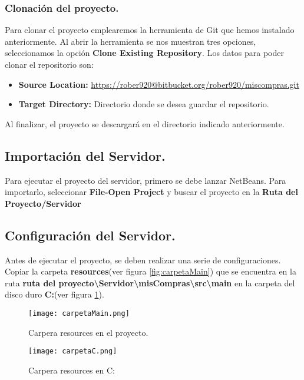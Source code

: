 \subsubsection{Clonación del proyecto.}

Para clonar el proyecto emplearemos la herramienta de Git que hemos instalado anteriormente. Al abrir la herramienta se nos muestran tres opciones, seleccionamos la opción \textbf{Clone Existing Repository}.
Los datos para poder clonar el repositorio son:
\begin{itemize}
 \item \textbf{Source Location: }\url{https://rober920@bitbucket.org/rober920/miscompras.git}
 \item \textbf{Target Directory: } Directorio donde se desea guardar el repositorio.
\end{itemize}

Al finalizar, el proyecto se descargará en el directorio indicado anteriormente.

\subsection{Importación del Servidor.}

Para ejecutar el proyecto del servidor, primero se debe lanzar NetBeans. Para importarlo, seleccionar \textbf{File-Open Project} y buscar el proyecto en la \textbf{Ruta del Proyecto/Servidor}

\cleardoublepage
\subsection{Configuración del Servidor.\label{cloneServidor}}

Antes de ejecutar el proyecto, se deben realizar una serie de configuraciones.
Copiar la carpeta \textbf{resources}(ver figura \ref{fig:carpetaMain}) que se encuentra en la ruta \textbf{ruta del proyecto\textbackslash Servidor\textbackslash misCompras\textbackslash src\textbackslash main} en la carpeta del disco duro \textbf{C:}(ver figura \ref{fig:carpetaC}).

\begin{figure}[ht]
\begin{center} 
  \texttt{[image: carpetaMain.png]}
  \caption{Carpera resources en el proyecto.}\label{fig:carpetaMain}
\endminipage\hfil
{}
  \texttt{[image: carpetaC.png]}
  \caption{Carpera resources en C:}\label{fig:carpetaC}
\endminipage
\end{center}
\end{figure}




